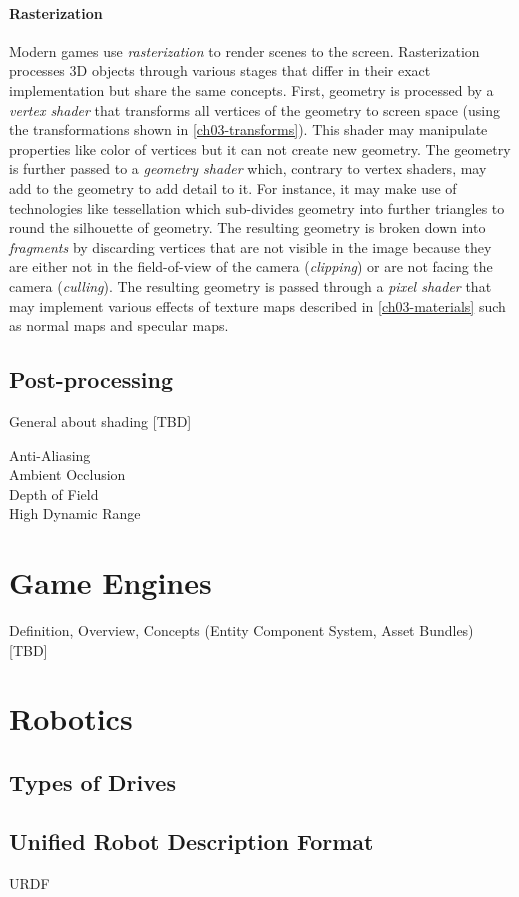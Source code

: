\paragraph{Rasterization} Modern games use \emph{rasterization} to render scenes to the screen. Rasterization processes 3D objects through various stages that differ in their exact implementation but share the same concepts. First, geometry is processed by a \emph{vertex shader} that transforms all vertices of the geometry to screen space (using the transformations shown in \ref{ch03-transforms}). This shader may manipulate properties like color of vertices but it can not create new geometry. The geometry is further passed to a \emph{geometry shader} which, contrary to vertex shaders, may add to the geometry to add detail to it. For instance, it may make use of technologies like tessellation which sub-divides geometry into further triangles to round the silhouette of geometry. The resulting geometry is broken down into \emph{fragments} by discarding vertices that are not visible in the image because they are either not in the field-of-view of the camera (\emph{clipping}) or are not facing the camera (\emph{culling}).
The resulting geometry is passed through a \emph{pixel shader} that may implement various effects of texture maps described in \ref{ch03-materials} such as normal maps and specular maps. 

\subsection{Post-processing}
General about shading [TBD]

\begin{description}
    \item[Anti-Aliasing]
    \item [Ambient Occlusion]
    \item [Depth of Field]
    \item [High Dynamic Range]
\end{description}


\section{Game Engines}
Definition, Overview, Concepts (Entity Component System, Asset Bundles) [TBD]

\section{Robotics}
\subsection{Types of Drives}
\subsection{Unified Robot Description Format}
\ac{URDF}